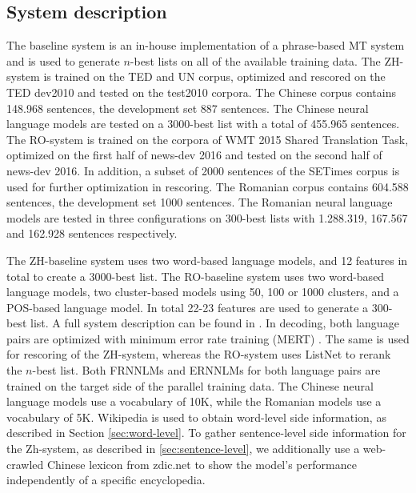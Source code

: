 \documentclass[a4paper]{article}
\begin{document}
\subsection{System description}
The baseline system is an in-house implementation of a phrase-based MT system and is used to generate $n$-best lists on all of the available training data. The ZH-system is trained on the TED and UN corpus, optimized and rescored on the TED dev2010 and tested on the test2010 corpora. The Chinese corpus contains 148.968 sentences, the development set 887 sentences. The Chinese neural language models are tested on a $3000$-best list with a total of 455.965 sentences.
The RO-system is trained on the corpora of WMT 2015 Shared Translation Task, optimized on the first half of news-dev 2016 and tested on the second half of news-dev 2016. In addition, a subset of 2000 sentences of the SETimes corpus is used for further optimization in rescoring. The Romanian corpus contains 604.588 sentences, the development set 1000 sentences. The Romanian neural language models are tested in three configurations on $300$-best lists with 1.288.319, 167.567 and 162.928 sentences respectively.

The ZH-baseline system uses two word-based language models, and 12 features in total to create a $3000$-best list.
The RO-baseline system uses two word-based language models, two cluster-based models using 50, 100 or 1000 clusters, and a POS-based language model. In total 22-23 features are used to generate a $300$-best list. A full system description can be found in \cite{niehuesusing}.
In decoding, both language pairs are optimized with minimum error rate training (MERT) \cite{och2003minimum}. The same is used for rescoring of the ZH-system, whereas the RO-system uses ListNet to rerank the $n$-best list.
Both FRNNLMs and ERNNLMs for both language pairs are trained on the target side of the parallel training data. The Chinese neural language models use a vocabulary of 10K, while the Romanian models use a vocabulary of 5K. Wikipedia is used to obtain word-level side information, as described in Section \ref{sec:word-level}.
To gather sentence-level side information for the Zh-system, as described in \ref{sec:sentence-level}, we additionally use a web-crawled Chinese lexicon from zdic.net \cite{zdic} to show the model's performance independently of a specific encyclopedia.
\end{document}
